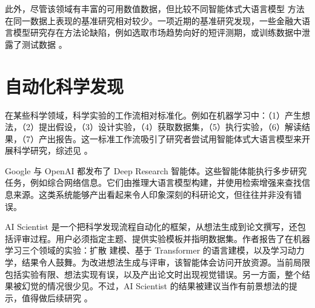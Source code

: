 此外，尽管该领域有丰富的可用数值数据，但比较不同智能体式大语言模型
方法在同一数据上表现的基准研究相对较少。一项近期的基准研究发现，一些金融大语言模型研究存在方法论缺陷，例如选取市场趋势向好的短评测期，或训练数据中泄露了测试数据 \citep{li2026can}。









\section{自动化科学发现}
在某些科学领域，科学实验的工作流相对标准化。例如在机器学习中：（1）产生想法，（2）提出假设，（3）设计实验，（4）获取数据集，（5）执行实验，（6）解读结果，（7）产出报告。这一标准工作流吸引了研究者尝试用智能体式大语言模型来开展科学研究，综述见 \citet{eger2025transforming}。

Google 与 OpenAI 都发布了 Deep Research 智能体。这些智能体能执行多步研究任务，例如综合网络信息。它们由推理大语言模型构建，并使用检索增强来查找信息来源。这类系统能够产出看起来令人印象深刻的科研论文，但往往并非没有错误。

AI Scientist \citep{lu2024ai} 是一个把科学发现流程自动化的框架，从想法生成到论文撰写，还包括评审过程。用户必须指定主题、提供实验模板并指明数据集。作者报告了在机器学习三个领域的实验：扩散
建模、基于 Transformer 的语言建模，以及学习动力学，结果令人鼓舞。为改进想法生成与评审，该智能体会访问开放资源。当前局限包括实验有限、想法实现有误，以及产出论文时出现视觉错误。另一方面，整个结果被幻觉的情况很少见。不过，AI Scientist 的结果被建议当作有前景想法的提示，值得做后续研究 \citep{lu2024ai}。


